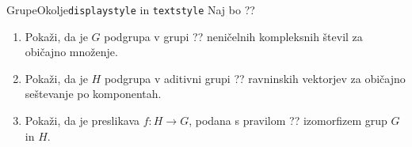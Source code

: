 \begin{frame}{Grupe}{Okolje\texttt{displaystyle} in \texttt{textstyle}}
	Naj bo
	??
	\begin{enumerate}
		\item
			Pokaži, da je $G$ podgrupa v grupi ??
			neničelnih kompleksnih števil za običajno množenje.
		\item
			Pokaži, da je $H$ podgrupa v aditivni grupi ??
			ravninskih vektorjev za običajno seštevanje po komponentah.
		\item
			Pokaži, da je preslikava $f:H\to G$, podana s pravilom
			??
			izomorfizem grup $G$ in $H$.
	\end{enumerate}
\end{frame}


